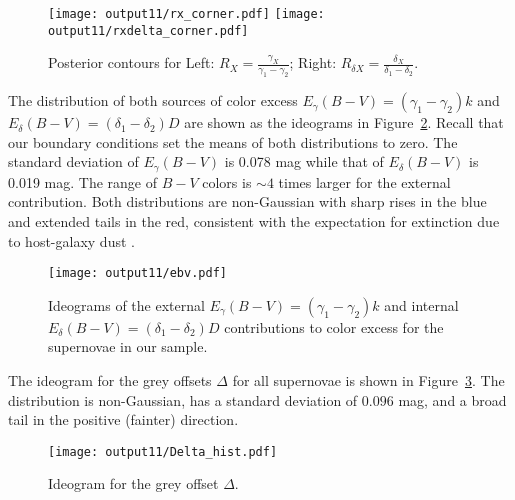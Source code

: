 \documentclass{aastex}   	%
\begin{document}
\begin{figure}[htbp] %
   \centering
   \texttt{[image: output11/rx\_corner.pdf]}
      \texttt{[image: output11/rxdelta\_corner.pdf]} 
   \caption{Posterior contours for Left:  $R_X=\frac{\gamma_X}{\gamma_1-\gamma_2}$;  Right:  $R_{\delta X}=\frac{\delta_X}{\delta_1-\delta_2}$.
   \label{rx:fig}}
\end{figure}

The distribution of both sources of color excess $E_\gamma(B-V) =(\gamma_1-\gamma_2)k$ and
 $E_\delta(B-V) = (\delta_1-\delta_2)D$ are shown as the ideograms in Figure~\ref{ebv:fig}.
Recall that our boundary conditions set the means of both distributions to zero. 
The standard deviation of $E_\gamma(B-V)$ is 0.078 mag while that of $E_\delta(B-V)$ is 0.019 mag.
The range of $B-V$ colors is $\sim 4$ times larger for the external contribution. 
Both distributions are non-Gaussian with sharp rises in the blue and extended tails in the red, consistent
with the expectation for extinction due to host-galaxy dust \citep{1998ApJ...502..177H}.

\begin{figure}[htbp] %
   \centering
   \texttt{[image: output11/ebv.pdf]}
   \caption{Ideograms of the external $E_\gamma(B-V) =(\gamma_1-\gamma_2)k$ and
   internal $E_\delta(B-V) = (\delta_1-\delta_2)D$  contributions to color excess  for the supernovae in our sample.
   \label{ebv:fig}}
\end{figure}



The ideogram for the grey offsets $\Delta$ for all supernovae is shown in Figure~\ref{hist:fig}.  The distribution is non-Gaussian, 
has a standard deviation of $0.096$ mag, and a broad tail in the positive (fainter) direction.
\begin{figure}[htbp] %
   \centering
   \texttt{[image: output11/Delta\_hist.pdf]} 
   \caption{Ideogram for the grey offset $\Delta$.
   \label{hist:fig}}
\end{figure}
\end{document}
